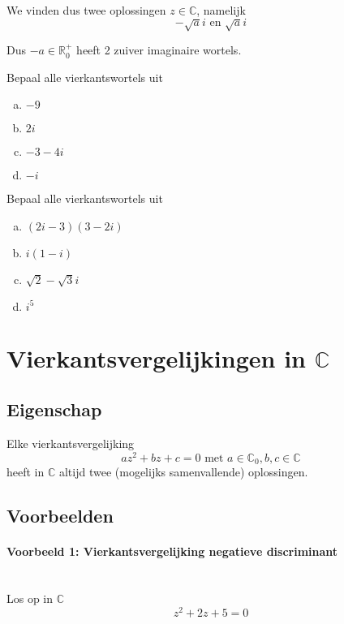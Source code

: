 \documentclass[12pt,twoside]{article}
\begin{document}
We vinden dus twee oplossingen $z\in\mathbb{C}$, namelijk
$$-\sqrt{a}i \mbox{ en } \sqrt{a}i$$

Dus $-a\in\mathbb{R}^+_0$ heeft 2 zuiver imaginaire wortels.


\begin{oefening}
  Bepaal alle vierkantswortels uit
  \begin{enumerate}[(a)]
    \itemsep 1em
  \item $-9$
  \item $2i$
  \item $-3-4i$
  \item $-i$
  \end{enumerate}
\end{oefening}

\begin{oefening}
  Bepaal alle vierkantswortels uit
  \begin{enumerate}[(a)]
    \itemsep 1em
  \item $(2i-3)(3-2i)$
  \item $i(1-i)$
  \item $\sqrt{2}-\sqrt{3}i$
  \item $i^5$
  \end{enumerate}
\end{oefening}

\pagebreak
\section{Vierkantsvergelijkingen in $\mathbb{C}$}

\subsection{Eigenschap}

\begin{mdframed}
Elke vierkantsvergelijking
$$az^2+bz+c=0 \text{ met } a\in\mathbb{C}_0, b,c\in\mathbb{C}$$
heeft in $\mathbb{C}$ altijd twee (mogelijks samenvallende) oplossingen.
\end{mdframed}

\subsection{Voorbeelden}

\paragraph*{Voorbeeld 1: Vierkantsvergelijking negatieve discriminant}\mbox{}\\
Los op in $\mathbb{C}$
$$z^2 + 2z + 5 = 0$$
\end{document}
